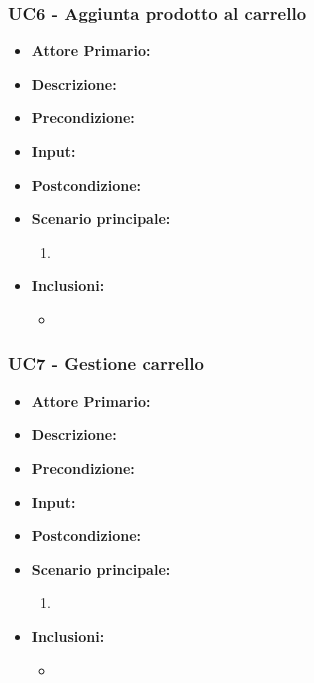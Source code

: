 \subsubsection{UC6 - Aggiunta prodotto al carrello}
\begin{itemize}
    \item \textbf{Attore Primario:} 
    \item \textbf{Descrizione:}
    \item \textbf{Precondizione:}
    \item \textbf{Input:}
    \item \textbf{Postcondizione:}
    \item \textbf{Scenario principale:}
    \begin{enumerate}
        \item 
    \end{enumerate}
    \item \textbf{Inclusioni:}
    \begin{itemize}
        \item
    \end{itemize}
\end{itemize}
\subsubsection{UC7 - Gestione carrello}
\begin{itemize}
    \item \textbf{Attore Primario:} 
    \item \textbf{Descrizione:}
    \item \textbf{Precondizione:}
    \item \textbf{Input:}
    \item \textbf{Postcondizione:}
    \item \textbf{Scenario principale:}
    \begin{enumerate}
        \item 
    \end{enumerate}
    \item \textbf{Inclusioni:}
    \begin{itemize}
        \item
    \end{itemize}
\end{itemize}
